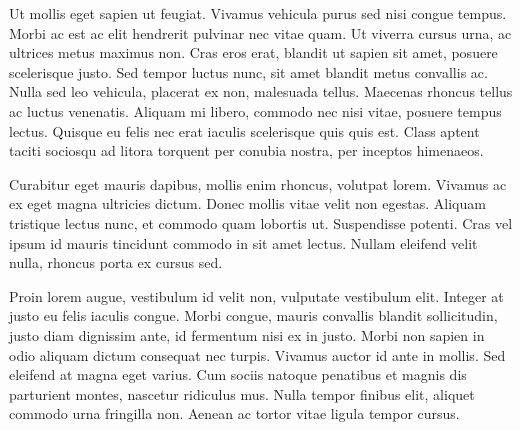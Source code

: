 Ut mollis eget sapien ut feugiat. Vivamus vehicula purus sed nisi congue tempus. Morbi ac est ac elit hendrerit pulvinar nec vitae quam. Ut viverra cursus urna, ac ultrices metus maximus non. Cras eros erat, blandit ut sapien sit amet, posuere scelerisque justo. Sed tempor luctus nunc, sit amet blandit metus convallis ac. Nulla sed leo vehicula, placerat ex non, malesuada tellus. Maecenas rhoncus tellus ac luctus venenatis. Aliquam mi libero, commodo nec nisi vitae, posuere tempus lectus. Quisque eu felis nec erat iaculis scelerisque quis quis est. Class aptent taciti sociosqu ad litora torquent per conubia nostra, per inceptos himenaeos.

Curabitur eget mauris dapibus, mollis enim rhoncus, volutpat lorem. Vivamus ac ex eget magna ultricies dictum. Donec mollis vitae velit non egestas. Aliquam tristique lectus nunc, et commodo quam lobortis ut. Suspendisse potenti. Cras vel ipsum id mauris tincidunt commodo in sit amet lectus. Nullam eleifend velit nulla, rhoncus porta ex cursus sed.

Proin lorem augue, vestibulum id velit non, vulputate vestibulum elit. Integer at justo eu felis iaculis congue. Morbi congue, mauris convallis blandit sollicitudin, justo diam dignissim ante, id fermentum nisi ex in justo. Morbi non sapien in odio aliquam dictum consequat nec turpis. Vivamus auctor id ante in mollis. Sed eleifend at magna eget varius. Cum sociis natoque penatibus et magnis dis parturient montes, nascetur ridiculus mus. Nulla tempor finibus elit, aliquet commodo urna fringilla non. Aenean ac tortor vitae ligula tempor cursus. 